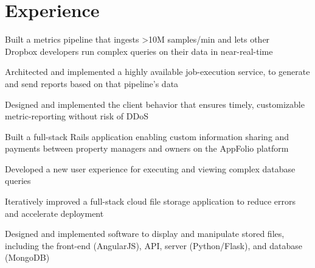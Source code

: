 \section{Experience}

\vspace{\topsep} %
\begin{tightemize}
\item Built a metrics pipeline that ingests >10M samples/min and lets other \\ Dropbox developers run complex queries on their data in near-real-time
\item Architected and implemented a highly available job-execution service, to generate and send reports based on that pipeline's data
\item Designed and implemented the client behavior that ensures timely, customizable metric-reporting without risk of DDoS
\end{tightemize}
\sectionsep

\begin{tightemize}
\item Built a full-stack Rails application enabling custom information sharing and payments between property managers and owners on the AppFolio platform
\item Developed a new user experience for executing and viewing complex database queries
\end{tightemize}
\sectionsep

\begin{tightemize}
\item Iteratively improved a full-stack cloud file storage application to reduce errors and accelerate deployment
\item Designed and implemented software to display and manipulate stored files, including the front-end (AngularJS), API, server (Python/Flask), and database (MongoDB)
\end{tightemize}
\sectionsep
